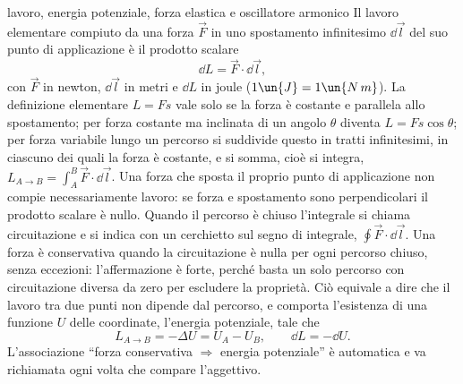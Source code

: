 \documentclass[main.tex]{subfiles}
\begin{document}
\renewcommand{\richiamoprefix}{Richiamo di Fisica 1 --- }
\begin{riquadro}{lavoro, energia potenziale, forza elastica e oscillatore armonico}
Il lavoro elementare compiuto da una forza $\vec F$ in uno spostamento infinitesimo $\dd\vec l$ del suo punto di applicazione è il prodotto scalare
\[
\dd L=\vec F\cdot\dd\vec l ,
\]
con $\vec F$ in newton, $\dd\vec l$ in metri e $\dd L$ in joule ($1\un{J}=1\un{N\,m}$). La definizione elementare $L=Fs$ vale solo se la forza è costante e parallela allo spostamento; per forza costante ma inclinata di un angolo $\theta$ diventa $L=Fs\cos\theta$; per forza variabile lungo un percorso si suddivide questo in tratti infinitesimi, in ciascuno dei quali la forza è costante, e si somma, cioè si integra, $L_{A\to B}=\int_A^B\vec F\cdot\dd\vec l$. Una forza che sposta il proprio punto di applicazione non compie necessariamente lavoro: se forza e spostamento sono perpendicolari il prodotto scalare è nullo. Quando il percorso è chiuso l'integrale si chiama circuitazione e si indica con un cerchietto sul segno di integrale, $\oint\vec F\cdot\dd\vec l$. Una forza è conservativa quando la circuitazione è nulla per ogni percorso chiuso, senza eccezioni: l'affermazione è forte, perché basta un solo percorso con circuitazione diversa da zero per escludere la proprietà. Ciò equivale a dire che il lavoro tra due punti non dipende dal percorso, e comporta l'esistenza di una funzione $U$ delle coordinate, l'energia potenziale, tale che
\[
L_{A\to B}=-\Delta U=U_A-U_B,\qquad \dd L=-\dd U .
\]
L'associazione \enquote{forza conservativa $\Rightarrow$ energia potenziale} è automatica e va richiamata ogni volta che compare l'aggettivo.


\end{riquadro}
\end{document}
